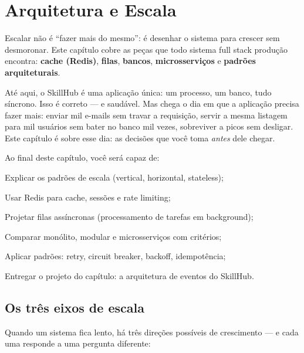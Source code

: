 \chapter{Arquitetura e Escala}
\label{cap:arquitetura}

\begin{caixaconceito}
Escalar não é ``fazer mais do mesmo'': é desenhar o sistema para crescer sem
desmoronar. Este capítulo cobre as peças que todo sistema full stack
produção encontra: \textbf{cache (Redis)}, \textbf{filas}, \textbf{bancos},
\textbf{microsserviços} e \textbf{padrões arquiteturais}.
\end{caixaconceito}

Até aqui, o SkillHub é uma aplicação única: um processo, um banco, tudo
síncrono. Isso é correto — e saudável. Mas chega o dia em que a aplicação
precisa fazer mais: enviar mil e-mails sem travar a requisição, servir a
mesma listagem para mil usuários sem bater no banco mil vezes, sobreviver a
picos sem desligar. Este capítulo é sobre esse dia: as decisões que você toma
\emph{antes} dele chegar.

Ao final deste capítulo, você será capaz de:
\begin{objetivos}
  \item Explicar os padrões de escala (vertical, horizontal, stateless);
  \item Usar Redis para cache, sessões e rate limiting;
  \item Projetar filas assíncronas (processamento de tarefas em background);
  \item Comparar monólito, modular e microsserviços com critérios;
  \item Aplicar padrões: retry, circuit breaker, backoff, idempotência;
  \item Entregar o projeto do capítulo: a arquitetura de eventos do SkillHub.
\end{objetivos}

\section{Os três eixos de escala}

Quando um sistema fica lento, há três direções possíveis de crescimento — e
cada uma responde a uma pergunta diferente:

